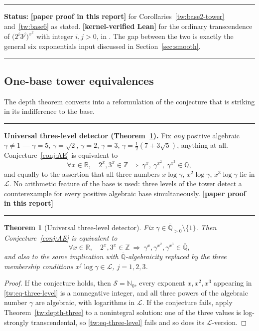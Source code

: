 \documentclass[11pt,oneside]{article}
\newtheorem{theorem}{Theorem}[section]
\theoremstyle{definition}
\theoremstyle{remark}
\newcommand{\Nzero}{\mathbb N_0}
\newcommand{\Z}{\mathbb Z}
\newcommand{\R}{\mathbb R}
\newcommand{\Abar}{\overline{\mathbb Q}}
\newcommand{\Sol}{\mathcal S}
\newcommand{\Apos}{\Abar_{>0}}
\newcommand{\LL}{\mathcal L}
\newcommand{\lean}[1]{\texttt{\detokenize{#1}}}
\newcommand{\statuslean}{\textcolor{leanblue}{\textbf{[kernel-verified Lean]}}}
\newcommand{\statusnew}{\textcolor{newgreen}{\textbf{[paper proof in this report]}}}
\newenvironment{statusbox}[1]
{\begin{center}\begin{minipage}{0.94\textwidth}\raggedright\hbadness=10000\hrule
\vspace{0.45em}\textbf{Status:} #1\par\vspace{0.35em}}
{\vspace{0.35em}\hrule\end{minipage}\end{center}}
\newenvironment{resultbox}
{\begin{center}\begin{minipage}{0.94\textwidth}\hrule\vspace{0.45em}}
{\vspace{0.35em}\hrule\end{minipage}\end{center}}
\begin{document}
\begin{statusbox}{\statusnew{} for Corollaries~\ref{tw:base2-tower} and~\ref{tw:base6} as
stated.  \statuslean{} for the ordinary transcendence of $\bigl(2^i3^j\bigr)^{x^2}$ with
integer $i,j>0$, in \lean{AlgebraicOutputLocus}.  The gap between the two is exactly the
general six exponentials input discussed in Section~\ref{sec:smooth}.}
\end{statusbox}

\subsection{One-base tower equivalences}

The depth theorem converts into a reformulation of the conjecture that is striking in its
indifference to the base.

\begin{resultbox}
\textbf{Universal three-level detector (Theorem~\ref{tw:universal-detector}).}
Fix \emph{any} positive algebraic $\gamma\ne1$ --- $\gamma=5$, $\gamma=\sqrt2$, $\gamma=2$,
$\gamma=3$, $\gamma=\tfrac12(7+3\sqrt5)$, anything at all.  Conjecture~\ref{conj:AE} is
equivalent to
\[
 \forall x\in\R,\quad 2^x,3^x\in\Z
 \ \Longrightarrow\
 \gamma^x,\ \gamma^{x^2},\ \gamma^{x^3}\in\Abar,
\]
and equally to the assertion that all three numbers $x\log\gamma$, $x^2\log\gamma$,
$x^3\log\gamma$ lie in $\LL$.  No arithmetic feature of the base is used: three levels of the
tower detect a counterexample for every positive algebraic base simultaneously. \statusnew
\end{resultbox}

\begin{theorem}[Universal three-level detector]
\label{tw:universal-detector}
Fix $\gamma\in\Apos\setminus\{1\}$.  Then Conjecture~\ref{conj:AE} is equivalent to
\begin{equation}
 \forall x\in\R,\quad
 2^x,3^x\in\Z
 \ \Longrightarrow\
 \gamma^x,\gamma^{x^2},\gamma^{x^3}\in\Abar,
 \label{tw:eq-three-level}
\end{equation}
and also to the same implication with $\Abar$-algebraicity replaced by the three membership
conditions $x^j\log\gamma\in\LL$, $j=1,2,3$.
\end{theorem}

\begin{proof}
If the conjecture holds, then $\Sol=\Nzero$, every exponent $x,x^2,x^3$ appearing in
\eqref{tw:eq-three-level} is a nonnegative integer, and all three powers of the algebraic
number $\gamma$ are algebraic, with logarithms in $\LL$.  If the conjecture fails, apply
Theorem~\ref{tw:depth-three} to a nonintegral solution: one of the three values is log-strongly
transcendental, so \eqref{tw:eq-three-level} fails and so does its $\LL$-version.
\end{proof}
\end{document}
